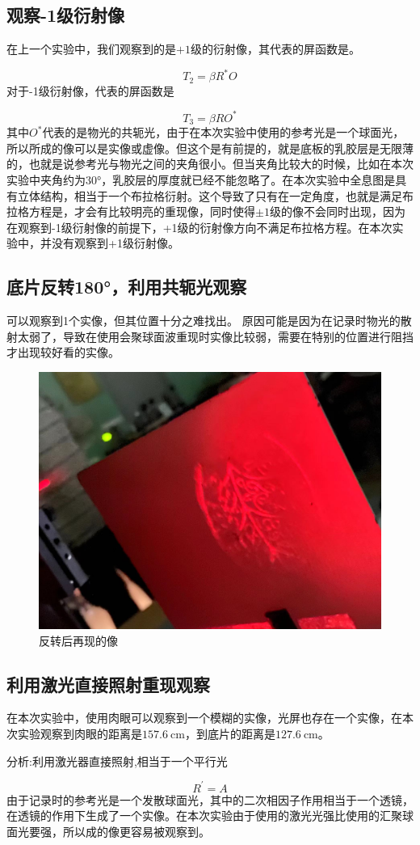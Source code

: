 \documentclass[a4paper]{article}
\begin{document}
\subsection{观察-1级衍射像}
\hspace{2em} 在上一个实验中，我们观察到的是$+1$级的衍射像，其代表的屏函数是。 \par
$$T_2=\beta R^\ast O$$
\hspace{2em} 对于-1级衍射像，代表的屏函数是 \par
$$T_3=\beta RO^\ast$$
\hspace{2em} 其中$O^\ast$代表的是物光的共轭光，由于在本次实验中使用的参考光是一个球面光，所以所成的像可以是实像或虚像。但这个是有前提的，就是底板的乳胶层是无限薄的，也就是说参考光与物光之间的夹角很小。但当夹角比较大的时候，比如在本次实验中夹角约为30°，乳胶层的厚度就已经不能忽略了。在本次实验中全息图是具有立体结构，相当于一个布拉格衍射。这个导致了只有在一定角度，也就是满足布拉格方程是，才会有比较明亮的重现像，同时使得$\pm1$级的像不会同时出现，因为在观察到-1级衍射像的前提下，+1级的衍射像方向不满足布拉格方程。在本次实验中，并没有观察到+1级衍射像。 \par

\subsection{底片反转180°，利用共轭光观察}
\hspace{2em} 可以观察到1个实像，但其位置十分之难找出。 原因可能是因为在记录时物光的散射太弱了，导致在使用会聚球面波重现时实像比较弱，需要在特别的位置进行阻挡才出现较好看的实像。\par
\begin{figure}[H]
    \centering
    \captionsetup{justification=centering,margin=2cm}
    \includegraphics[width=.4\textwidth]{fig5.jpg}
    \caption{反转后再现的像}
\end{figure}

\subsection{利用激光直接照射重现观察}
\hspace{2em} 在本次实验中，使用肉眼可以观察到一个模糊的实像，光屏也存在一个实像，在本次实验观察到肉眼的距离是$\SI{157.6}{\cm}$，到底片的距离是$\SI{127.6}{\cm}$。\par
\hspace{2em} 分析:利用激光器直接照射,相当于一个平行光 \par
$$R^\prime=A$$
\hspace{2em} 由于记录时的参考光是一个发散球面光，其中的二次相因子作用相当于一个透镜，在透镜的作用下生成了一个实像。在本次实验由于使用的激光光强比使用的汇聚球面光要强，所以成的像更容易被观察到。\par
\end{document}
